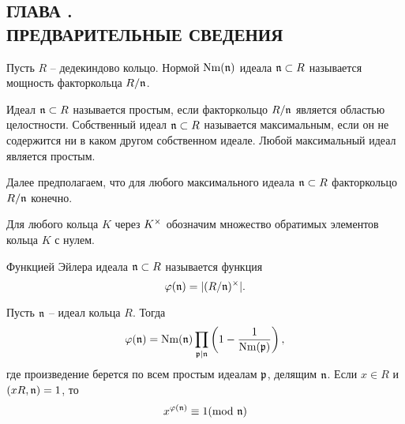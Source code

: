 \documentclass[_00_dissertation.tex]{subfiles}
\begin{document}
\onlyinsubfile{
    \renewcommand{\contentsname}{ОГЛАВЛЕНИЕ}
    \setcounter{tocdepth}{3}
    \tableofcontents
}

\newpage
\begin{center}
    \section*{ГЛАВА .\\ ПРЕДВАРИТЕЛЬНЫЕ СВЕДЕНИЯ}\label{ch:Prelimiaries}
\end{center}

Пусть $R$ -- дедекиндово кольцо.
Нормой $\textrm{Nm}(\mathfrak{n})$ идеала $\mathfrak{n} \subset R$ называется мощность факторкольца $R/\mathfrak{n}$.

Идеал $\mathfrak{n} \subset R$ называется простым, если факторкольцо $R/\mathfrak{n}$ является областью целостности.
Собственный идеал $\mathfrak{n} \subset R$ называется максимальным, если он не содержится ни в каком другом собственном идеале.
Любой максимальный идеал является простым.

Далее предполагаем, что для любого  максимального идеала $\mathfrak{n} \subset R$ факторкольцо $R/\mathfrak{n}$ конечно.

Для любого кольца $K$ через $K^{\times}$ обозначим множество обратимых элементов кольца $K$ с нулем.

\begin{definition}
    Функцией Эйлера идеала $\mathfrak{n} \subset R$ называется функция
    \begin{equation*}
        \varphi(\mathfrak{n}) = |(R/\mathfrak{n})^{\times}|.
    \end{equation*}
\end{definition}

\begin{statement}\cite{Narkiewicz}\label{statement:euler_function}
    Пусть $\mathfrak{n}$ -- идеал кольца $R$.
    Тогда
    \begin{equation*}
        \varphi(\mathfrak{n}) = \textrm{Nm}(\mathfrak{n}) \prod_{\mathfrak{p} | \mathfrak{n}} \left(
            1 - \frac{1}{\textrm{Nm}(\mathfrak{p})}
        \right),
    \end{equation*}
    где произведение берется по всем простым идеалам $\mathfrak{p}$, делящим $\mathfrak{n}$.
    Если $x \in R$ и $(xR, \mathfrak{n}) = 1$, то
    \begin{equation*}
        x^{\varphi(\mathfrak{n})} \equiv 1 (\textrm{mod } \mathfrak{n})
    \end{equation*}
\end{statement}
\end{document}
